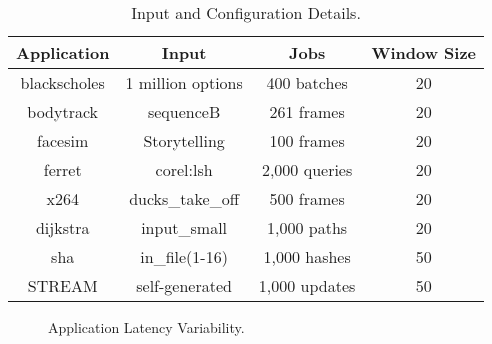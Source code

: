 \begin{table}[t]
\small
\centering
\caption{Input and Configuration Details.}
\begin{tabular}{cccc}
  \textbf{Application} & \textbf{Input} & \textbf{Jobs} & \textbf{Window Size} \\
  \hline
  \hline
  blackscholes   & 1 million options              & 400 batches   & 20 \\
  bodytrack      & sequenceB                      & 261 frames    & 20 \\
  facesim        & Storytelling                   & 100 frames    & 20 \\
  ferret         & corel:lsh                      & 2,000 queries & 20 \\
  x264           & ducks\_take\_off               & 500 frames    & 20 \\
  dijkstra       & input\_small                   & 1,000 paths   & 20 \\
  sha            & in\_file(1-16)                 & 1,000 hashes  & 50 \\
  STREAM         & self-generated                 & 1,000 updates & 50 \\
  \hline
  \hline
\end{tabular}
\label{tbl:poet-inputs}
\end{table}

\begin{figure}[t]
  \centering
  
  \caption{Application Latency Variability.}
  \label{fig:poet-variation}
\end{figure}
